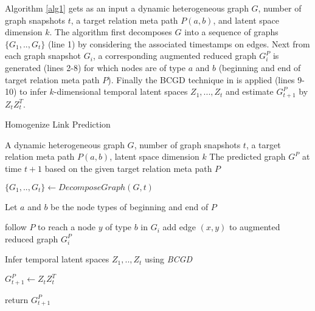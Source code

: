 


Algorithm \ref{alg1} gets as an input a dynamic heterogeneous graph $G$, number of graph snapshots $t$, a target relation meta path $P(a,b)$, and latent space dimension $k$. The algorithm first decomposes $G$ into a sequence of graphs $\{G_1, .., G_t\}$ (line 1) by considering the associated timestamps on edges. Next from each graph snapshot $G_i$, a corresponding augmented reduced graph $G^P_i$ is generated (lines 2-8) for which nodes are of type $a$ and $b$ (beginning and end of target relation meta path $P$). Finally the BCGD technique in \cite{Zhu2016} is applied (lines 9-10) to infer $k$-dimensional temporal latent spaces $Z_1, ...,Z_t$ and estimate $G^P_{t+1}$ by $Z_tZ_t^T$.


\begin{algorithm}[t]
\caption{Homogenize Link Prediction}\label{alg1}
\begin{algorithmic}[1]\scriptsize
\REQUIRE A dynamic heterogeneous graph $G$, number of graph snapshots $t$, a target relation meta path $P(a,b)$, latent space dimension $k$
\ENSURE The predicted graph $G^P$ at time $t+1$ based on the given target relation meta path $P$

\STATE $\{G_1, .., G_t\} \leftarrow DecomposeGraph(G, t)$

    \STATE Let $a$ and $b$ be the node types of beginning and end of $P$
    
        \STATE follow $P$ to reach a node $y$ of type $b$ in $G_i$ 
        \STATE add edge $(x,y)$ to augmented reduced graph $G_i^P$ 
\ENDFOR

\ENDFOR
\STATE Infer temporal latent spaces $Z_1, .., Z_t$ using \textit{BCGD}%

\STATE $G^P_{t+1} \leftarrow Z_tZ^T_t$ 

\STATE return $G^P_{t+1}$
\end{algorithmic}
\end{algorithm}



